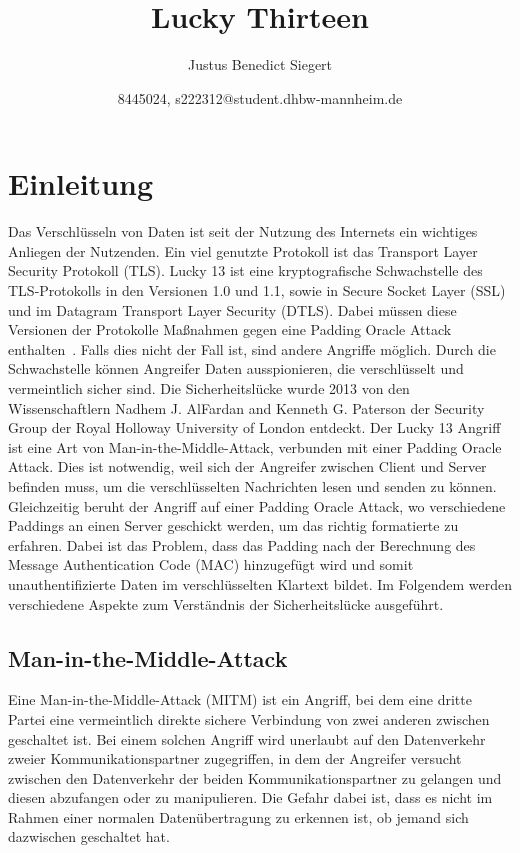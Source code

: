 \documentclass[a4paper,10pt]{scrartcl}
\begin{document}
    \title{Lucky Thirteen}
    \author{Justus Benedict Siegert}
    \date{8445024, s222312@student.dhbw-mannheim.de}
    \maketitle
    \tableofcontents
    \newpage


    \section{Einleitung}\label{sec:einleitung}
    Das Verschlüsseln von Daten ist seit der Nutzung des Internets ein wichtiges Anliegen der Nutzenden.
    Ein viel genutzte Protokoll ist das Transport Layer Security Protokoll (TLS)\cite{letcencrypt2023}.
    Lucky 13 ist eine kryptografische Schwachstelle des TLS-Protokolls in den Versionen 1.0 und 1.1, sowie in Secure Socket Layer (SSL) und im Datagram Transport Layer Security (DTLS).
    Dabei müssen diese Versionen der Protokolle Maßnahmen gegen eine Padding Oracle Attack enthalten~\cite[S.2]{AlFardan2013}.
    Falls dies nicht der Fall ist, sind andere Angriffe möglich.
    Durch die Schwachstelle können Angreifer Daten ausspionieren, die verschlüsselt und vermeintlich sicher sind.
    Die Sicherheitslücke wurde 2013 von den Wissenschaftlern Nadhem J. AlFardan and Kenneth G. Paterson der Security Group der Royal Holloway University of London entdeckt.
    \newline
    Der Lucky 13 Angriff ist eine Art von Man-in-the-Middle-Attack, verbunden mit einer Padding Oracle Attack.
    Dies ist notwendig, weil sich der Angreifer zwischen Client und Server befinden muss, um die verschlüsselten Nachrichten lesen und senden zu können.
    Gleichzeitig beruht der Angriff auf einer Padding Oracle Attack, wo verschiedene Paddings an einen Server geschickt werden, um das richtig formatierte zu erfahren.
    Dabei ist das Problem, dass das Padding nach der Berechnung des Message Authentication Code (MAC) hinzugefügt wird und somit unauthentifizierte Daten im verschlüsselten Klartext bildet\cite[S.2]{AlFardan2013}. %
    Im Folgendem werden verschiedene Aspekte zum Verständnis der Sicherheitslücke ausgeführt.

    \subsection{Man-in-the-Middle-Attack}\label{subsec:man-in-the-middle-attack}
    Eine Man-in-the-Middle-Attack (MITM) ist ein Angriff, bei dem eine dritte Partei eine vermeintlich direkte sichere Verbindung von zwei anderen zwischen geschaltet ist.
    Bei einem solchen Angriff wird unerlaubt auf den Datenverkehr zweier Kommunikationspartner zugegriffen, in dem der Angreifer versucht zwischen den Datenverkehr der beiden Kommunikationspartner zu gelangen und diesen abzufangen oder zu manipulieren.
    Die Gefahr dabei ist, dass es nicht im Rahmen einer normalen Datenübertragung zu erkennen ist, ob jemand sich dazwischen geschaltet hat.
\end{document}
